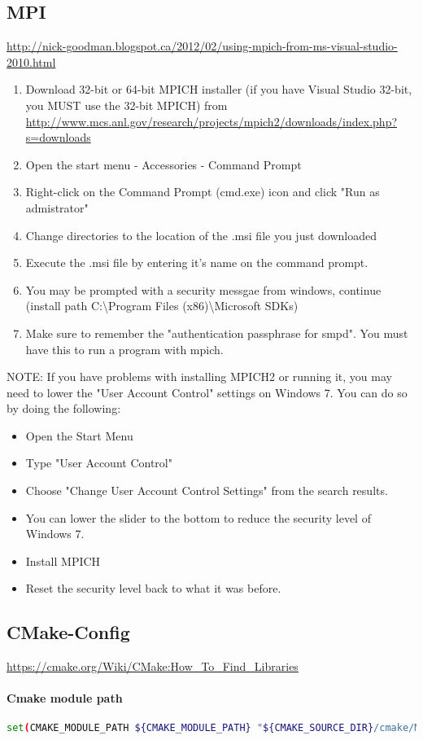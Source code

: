  \subsection{MPI}
 \url{http://nick-goodman.blogspot.ca/2012/02/using-mpich-from-ms-visual-studio-2010.html}
 \begin{enumerate}
\item Download 32-bit or 64-bit MPICH installer (if you have Visual Studio 32-bit, you MUST use the 32-bit MPICH) from \url{http://www.mcs.anl.gov/research/projects/mpich2/downloads/index.php?s=downloads}
\item  Open the start menu - Accessories - Command Prompt
\item Right-click on the Command Prompt (cmd.exe) icon and click "Run as admistrator"
\item Change directories to the location of the .msi file you just downloaded
\item Execute the .msi file by entering it's name on the command prompt.
\item You may be prompted with a security messgae from windows, continue (install path C:\textbackslash Program Files (x86)\textbackslash Microsoft SDKs)
\item Make sure to remember the "authentication passphrase for smpd".  You must have this to run a program with mpich.
\end{enumerate} 
 NOTE: If you have problems with installing MPICH2 or running it, you may need to lower the "User Account Control" settings on Windows 7.  You can do so by doing the following:
\begin{itemize}\item  Open the Start Menu
\item Type "User Account Control"
\item Choose "Change User Account Control Settings" from the search results.
\item You can lower the slider to the bottom to reduce the security level of Windows 7.
\item Install MPICH
\item Reset the security level back to what it was before. \end{itemize}
\subsection{CMake-Config}
\url{https://cmake.org/Wiki/CMake:How_To_Find_Libraries}
\paragraph{Cmake module path} \begin{lstlisting}[language=sh]
set(CMAKE_MODULE_PATH ${CMAKE_MODULE_PATH} "${CMAKE_SOURCE_DIR}/cmake/Modules/")
\end{lstlisting}

